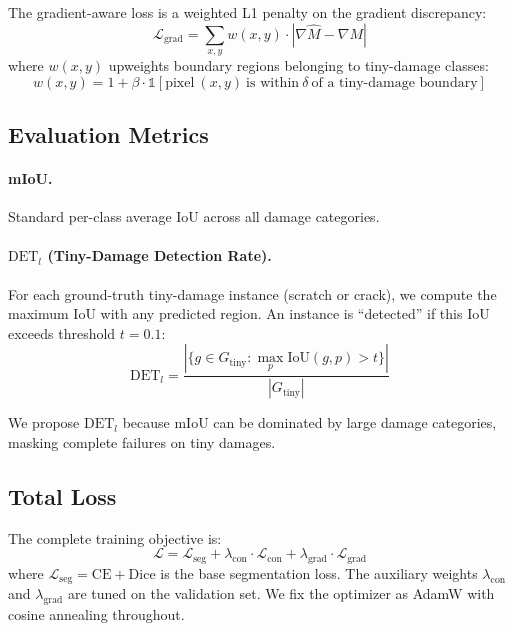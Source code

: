\documentclass[10pt,twocolumn]{article}
\begin{document}
The gradient-aware loss is a weighted L1 penalty on the gradient discrepancy:
\begin{equation}
    \mathcal{L}_{\text{grad}} = \sum_{x,y} w(x,y) \cdot |\nabla\hat{M} - \nabla M|
\end{equation}
where $w(x,y)$ upweights boundary regions belonging to tiny-damage classes:
\begin{equation}
    w(x,y) = 1 + \beta \cdot \mathbb{1}[\text{pixel}~(x,y)~\text{is within}~\delta~\text{of a tiny-damage boundary}]
\end{equation}

\subsection{Evaluation Metrics}
\label{sec:metrics}

\paragraph{mIoU.} Standard per-class average IoU across all damage categories.

\paragraph{$\text{DET}_l$ (Tiny-Damage Detection Rate).} For each ground-truth tiny-damage instance (scratch or crack), we compute the maximum IoU with any predicted region. An instance is ``detected'' if this IoU exceeds threshold $t = 0.1$:
\begin{equation}
    \text{DET}_l = \frac{|\{g \in G_{\text{tiny}} : \max_p \text{IoU}(g, p) > t\}|}{|G_{\text{tiny}}|}
\end{equation}

We propose $\text{DET}_l$ because mIoU can be dominated by large damage categories, masking complete failures on tiny damages.

\subsection{Total Loss}

The complete training objective is:
\begin{equation}
    \mathcal{L} = \mathcal{L}_{\text{seg}} + \lambda_{\text{con}} \cdot \mathcal{L}_{\text{con}} + \lambda_{\text{grad}} \cdot \mathcal{L}_{\text{grad}}
\end{equation}
where $\mathcal{L}_{\text{seg}} = \text{CE} + \text{Dice}$ is the base segmentation loss. The auxiliary weights $\lambda_{\text{con}}$ and $\lambda_{\text{grad}}$ are tuned on the validation set. We fix the optimizer as AdamW with cosine annealing throughout.
\end{document}
